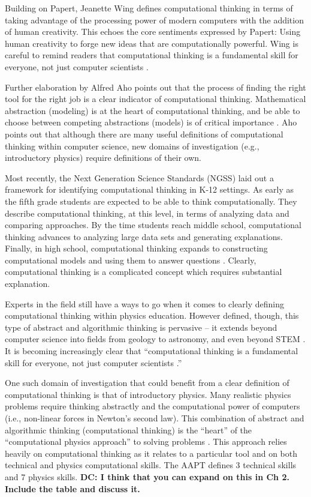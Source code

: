 \documentclass{msuphddissertation}
\begin{document}
\begin{doublespace}
Building on Papert, Jeanette Wing defines computational thinking in terms of taking advantage of the processing power of modern computers with the addition of human creativity.  This echoes the core sentiments expressed by Papert: Using human creativity to forge new ideas that are computationally powerful.  Wing is careful to remind readers that computational thinking is a fundamental skill for everyone, not just computer scientists \cite{Wing2008}.

Further elaboration by Alfred Aho points out that the process of finding the right tool for the right job is a clear indicator of computational thinking.  Mathematical abstraction (modeling) is at the heart of computational thinking, and be able to choose between competing abstractions (models) is of critical importance \cite{Aho2012}.  Aho points out that although there are many useful definitions of computational thinking within computer science, new domains of investigation (e.g., introductory physics) require definitions of their own.

Most recently, the Next Generation Science Standards (NGSS) laid out a framework for identifying computational thinking in K-12 settings.  As early as the fifth grade students are expected to be able to think computationally.  They describe computational thinking, at this level, in terms of analyzing data and comparing approaches.  By the time students reach middle school, computational thinking advances to analyzing large data sets and generating explanations.  Finally, in high school, computational thinking expands to constructing computational models and using them to answer questions \cite{NGSS2012}.  Clearly, computational thinking is a complicated concept which requires substantial explanation.

Experts in the field still have a ways to go when it comes to clearly defining computational thinking within physics education.  However defined, though, this type of abstract and algorithmic thinking is pervasive -- it extends beyond computer science into fields from geology to astronomy, and even beyond STEM \cite{Bundy2007}.  It is becoming increasingly clear that ``computational thinking is a fundamental skill for everyone, not just computer scientists \cite{Wing2006}.''

One such domain of investigation that could benefit from a clear definition of computational thinking is that of introductory physics.  Many realistic physics problems require thinking abstractly and the computational power of computers (i.e., non-linear forces in Newton's second law).  This combination of abstract and algorithmic thinking (computational thinking) is the ``heart'' of the ``computational physics approach'' to solving problems \cite{AAPT2016}.  This approach relies heavily on computational thinking as it relates to a particular tool and on both technical and physics computational skills.  The AAPT defines 3 technical skills and 7 physics skills. {\bf DC: I think that you can expand on this in Ch 2. Include the table and discuss it.}


\end{doublespace}
\end{document}
